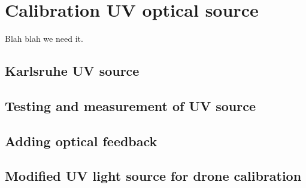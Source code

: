 
\chapter{Calibration UV optical source}
Blah blah we need it.
\section{Karlsruhe UV source}


\section{Testing and measurement of UV source}

\section{Adding optical feedback}


\section{Modified UV light source for drone calibration 	}



